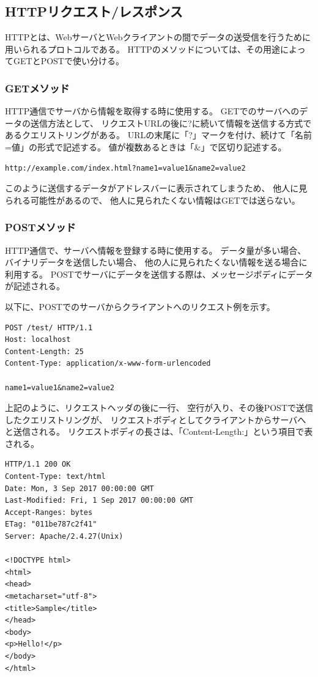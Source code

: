 \documentclass[12pt]{jarticle}
\begin{document}
\clearpage

\subsection{HTTPリクエスト/レスポンス}
HTTPとは、WebサーバとWebクライアントの間でデータの送受信を行うために用いられるプロトコルである。
HTTPのメソッドについては、その用途によってGETとPOSTで使い分ける。

\subsubsection*{GETメソッド}
HTTP通信でサーバから情報を取得する時に使用する。
GETでのサーバへのデータの送信方法として、
リクエストURLの後に?に続いて情報を送信する方式であるクエリストリングがある。
URLの末尾に「?」マークを付け、続けて「名前=値」の形式で記述する。
値が複数あるときは「$\&$」で区切り記述する。

\begin{lstlisting}[style = log]
http://example.com/index.html?name1=value1&name2=value2
\end{lstlisting}

このように送信するデータがアドレスバーに表示されてしまうため、
他人に見られる可能性があるので、
他人に見られたくない情報はGETでは送らない。

\subsubsection*{POSTメソッド}
HTTP通信で、サーバへ情報を登録する時に使用する。
データ量が多い場合、バイナリデータを送信したい場合、
他の人に見られたくない情報を送る場合に利用する。
POSTでサーバにデータを送信する際は、メッセージボディにデータが記述される。

以下に、POSTでのサーバからクライアントへのリクエスト例を示す。

\begin{lstlisting}[style = log]
POST /test/ HTTP/1.1
Host: localhost
Content-Length: 25
Content-Type: application/x-www-form-urlencoded

name1=value1&name2=value2
\end{lstlisting}

上記のように、リクエストヘッダの後に一行、
空行が入り、その後POSTで送信したクエリストリングが、
リクエストボディとしてクライアントからサーバへと送信される。
リクエストボディの長さは、「Content-Length:」という項目で表される。

\clearpage

\begin{lstlisting}[style = log]
HTTP/1.1 200 OK
Content-Type: text/html
Date: Mon, 3 Sep 2017 00:00:00 GMT
Last-Modified: Fri, 1 Sep 2017 00:00:00 GMT
Accept-Ranges: bytes
ETag: "011be787c2f41"
Server: Apache/2.4.27(Unix)

<!DOCTYPE html>
<html>
<head>
<metacharset="utf-8">
<title>Sample</title>
</head>
<body>
<p>Hello!</p>
</body>
</html>
\end{lstlisting}
\end{document}
